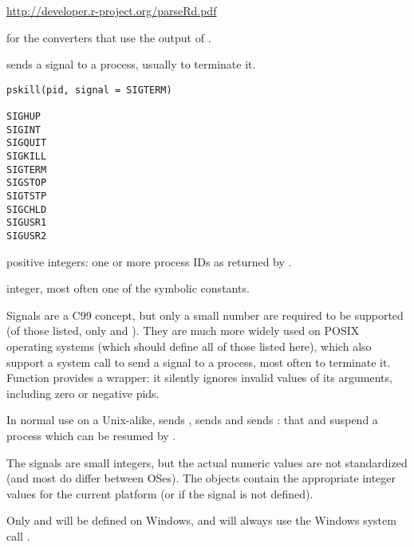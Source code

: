 %
\begin{References}\relax
 \url{http://developer.r-project.org/parseRd.pdf} 
\end{References}
%
\begin{SeeAlso}\relax
{} for the converters that use the output of
.
\end{SeeAlso}
%
\begin{Description}\relax
{} sends a signal to a process, usually to terminate it.
\end{Description}
%
\begin{Usage}
\begin{verbatim}
pskill(pid, signal = SIGTERM)

SIGHUP
SIGINT
SIGQUIT
SIGKILL
SIGTERM
SIGSTOP
SIGTSTP
SIGCHLD
SIGUSR1
SIGUSR2
\end{verbatim}
\end{Usage}
%
\begin{Arguments}
\begin{ldescription}
\item[\code{pid}] positive integers: one or more process IDs as returned by
.
\item[\code{signal}] integer, most often one of the symbolic constants.
\end{ldescription}
\end{Arguments}
%
\begin{Details}\relax
Signals are a C99 concept, but only a small number are required to be
supported (of those listed, only  and ).
They are much more widely used on POSIX operating systems (which
should define all of those listed here), which also support a
 system call to send a signal to a process, most often to
terminate it.  Function  provides a wrapper: it silently
ignores invalid values of its arguments, including zero or negative pids.

In normal use on a Unix-alike,  sends ,
 sends  and  sends
: that and  suspend a process which can be
resumed by .

The signals are small integers, but the actual numeric values are not
standardized (and most do differ between OSes).  The 
objects contain the appropriate integer values for the current platform
(or  if the signal is not defined).

Only  and  will be defined on Windows, and
 will always use the Windows system call
.
\end{Details}
